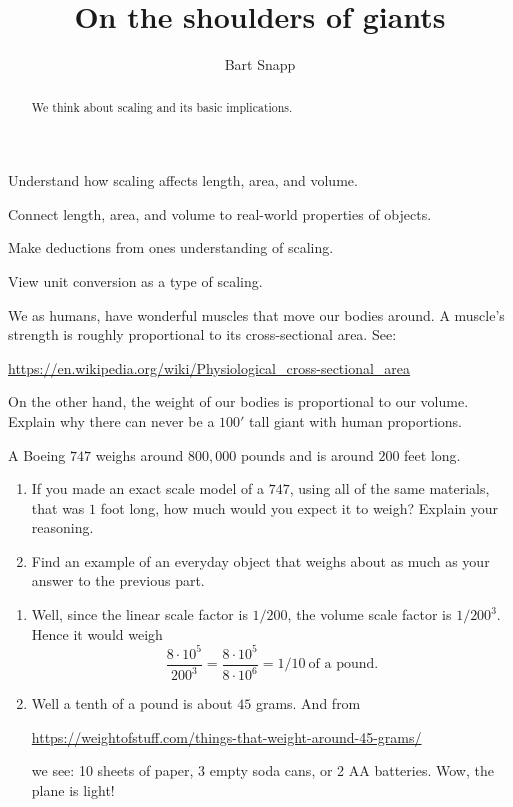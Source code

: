 \documentclass[handout,nooutcomes,noauthor,hints]{ximera}
\title{On the shoulders of giants}
\author{Bart Snapp}
\begin{document}
\begin{abstract}
  We think about scaling and its basic implications.
\end{abstract}
\maketitle

\begin{listOutcomes}
\item Understand how scaling affects length, area, and volume.
\item Connect length, area, and volume to real-world properties of objects.
\item Make deductions from ones understanding of scaling.
\item View unit conversion as a type of scaling.
\end{listOutcomes}

\mynewpage
\begin{question}
  We as humans, have wonderful muscles that move our bodies
  around. A muscle's strength is roughly proportional to
  its cross-sectional area. See:
  \begin{center}
    \url{https://en.wikipedia.org/wiki/Physiological_cross-sectional_area}
  \end{center}
  On the other hand, the weight of our bodies is proportional to our
  volume. Explain why there can never be a $100'$ tall giant with human proportions.
\end{question}
\mynewpage


\begin{question}
  A Boeing $747$ weighs around $800,000$ pounds and is around $200$
  feet long.
  \begin{enumerate}
    \item If you made an exact scale model of a $747$, using all of
      the same materials, that was $1$ foot long, how much would you
      expect it to weigh? Explain your reasoning.
    \item Find an example of an everyday object that weighs about as
      much as your answer to the previous part.
  \end{enumerate}
      \begin{freeResponse}
        \begin{enumerate}
          \item Well, since the linear scale factor is $1/200$, the volume scale
          factor is $1/200^3$. Hence it would weigh
          \[
          \frac{8\cdot10^5}{200^3} =\frac{8\cdot10^5}{8\cdot 10^6}=1/10~\text{of a pound.}
          \]
        \item Well a tenth of a pound is about $45$ grams. And from
          \begin{center}
          \url{https://weightofstuff.com/things-that-weight-around-45-grams/}
          \end{center}
          we see: 10 sheets of paper, 3 empty soda cans, or 2 AA
          batteries. Wow, the plane is light!
        \end{enumerate}
        \end{freeResponse}
\end{question}
\mynewpage
\end{document}
